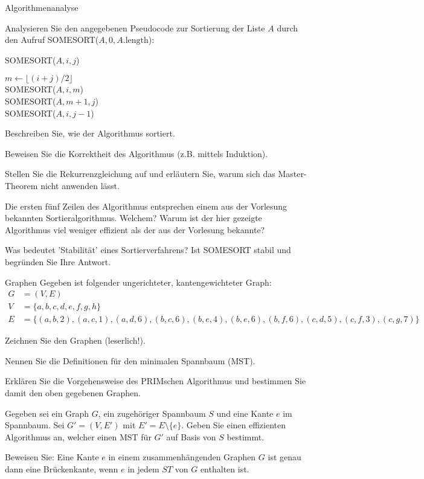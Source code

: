 \documentclass{exercisesheet}
\begin{document}
\begin{eexercises}{Algorithmenanalyse}{
    Analysieren Sie den angegebenen Pseudocode zur Sortierung der Liste $A$ durch den Aufruf SOMESORT($A, 0, A.\text{length}$):
    \begin{algorithm}[ht]
      \caption{SOMESORT($A, i, j$)}
      $m \gets \lfloor (i+j)/2 \rfloor$ \\
      SOMESORT($A, i, m$) \\
      SOMESORT($A, m+1, j$) \\
      SOMESORT($A, i, j-1$)
    \end{algorithm}
  }
  \item Beschreiben Sie, wie der Algorithmus sortiert.
  \item Beweisen Sie die Korrektheit des Algorithmus (z.B. mittels Induktion).
  \item Stellen Sie die Rekurrenzgleichung auf und erläutern Sie, warum sich das Master-Theorem nicht anwenden lässt.
  \item Die ersten fünf Zeilen des Algorithmus entsprechen einem aus der Vorlesung bekannten Sortieralgorithmus. Welchem? Warum ist der hier gezeigte Algorithmus viel weniger effizient als der aus der Vorlesung bekannte?
  \item Was bedeutet 'Stabilität' eines Sortierverfahrens? Ist SOMESORT stabil und begründen Sie Ihre Antwort.
\end{eexercises}

\begin{eexercises}{Graphen}{
    Gegeben ist folgender ungerichteter, kantengewichteter Graph:
    \begin{align*}
      G & = (V, E)                                                                                                           \\
      V & = \{a, b, c, d, e, f, g, h\}                                                                                       \\
      E & = \{(a, b, 2), (a, c, 1), (a, d, 6), (b, c, 6), (b, e, 4), (b, e, 6), (b, f, 6), (c, d, 5), (c, f, 3), (c, g, 7)\}
    \end{align*}
  }
  \item Zeichnen Sie den Graphen (leserlich!).
  \item Nennen Sie die Definitionen für den minimalen Spannbaum (MST).
  \item Erklären Sie die Vorgehensweise des PRIMschen Algorithmus und bestimmen Sie damit den oben gegebenen Graphen.
  \item Gegeben sei ein Graph $G$, ein zugehöriger Spannbaum $S$ und eine Kante $e$ im Spannbaum. Sei $G' = (V, E')$ mit $E' = E \setminus \{e\}$. Geben Sie einen effizienten Algorithmus an, welcher einen MST für $G'$ auf Basis von $S$ bestimmt.
  \item Beweisen Sie: Eine Kante $e$ in einem zusammenhängenden Graphen $G$ ist genau dann eine Brückenkante, wenn $e$ in jedem $ST$ von $G$ enthalten ist.
\end{eexercises}
\end{document}

